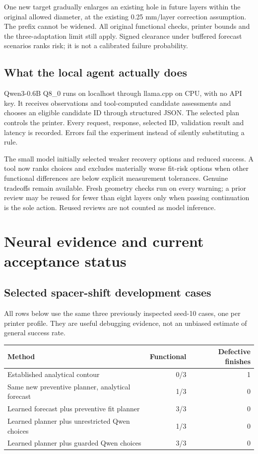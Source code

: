 \documentclass[10pt,letterpaper]{article}
\newcommand{\nextpage}{\clearpage}
\begin{document}
One new target gradually enlarges an existing hole in future layers within the
original allowed diameter, at the existing 0.25 mm/layer correction assumption.
The prefix cannot be widened. All original functional checks, printer bounds and
the three-adaptation limit still apply. Signed clearance under buffered forecast
scenarios ranks risk; it is not a calibrated failure probability.

\subsection*{What the local agent actually does}
Qwen3-0.6B Q8\_0 runs on localhost through llama.cpp on CPU, with no API key.
It receives observations and tool-computed candidate assessments and chooses an
eligible candidate ID through structured JSON. The selected plan controls the
printer. Every request, response, selected ID, validation result and latency is
recorded. Errors fail the experiment instead of silently substituting a rule.

The small model initially selected weaker recovery options and reduced success.
A tool now ranks choices and excludes materially worse fit-risk options when
other functional differences are below explicit measurement tolerances. Genuine
tradeoffs remain available. Fresh geometry checks run on every warning; a prior
review may be reused for fewer than eight layers only when passing continuation
is the sole action. Reused reviews are not counted as model inference.

\nextpage
\section{Neural evidence and current acceptance status}

\subsection*{Selected spacer-shift development cases}
All rows below use the same three previously inspected seed-10 cases, one per
printer profile. They are useful debugging evidence, not an unbiased estimate
of general success rate.

\begin{tabularx}{\linewidth}{@{}Yrr@{}}
\toprule
Method & Functional & Defective finishes\\
\midrule
Established analytical contour & 0/3 & 1\\
Same new preventive planner, analytical forecast & 1/3 & 0\\
Learned forecast plus preventive fit planner & 3/3 & 0\\
Learned planner plus unrestricted Qwen choices & 1/3 & 0\\
Learned planner plus guarded Qwen choices & 3/3 & 0\\
\bottomrule
\end{tabularx}
\end{document}
